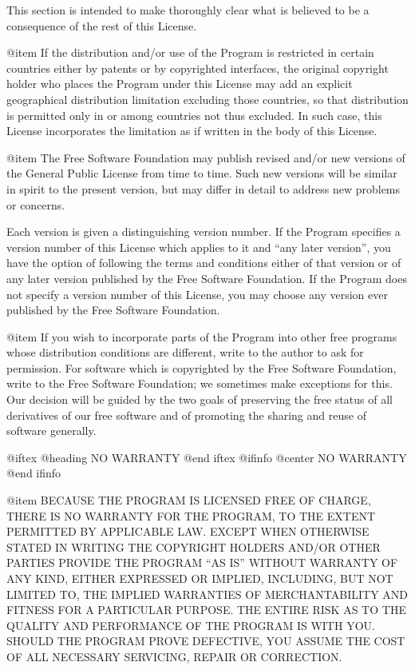 This section is intended to make thoroughly clear what is believed to
be a consequence of the rest of this License.

@item
If the distribution and/or use of the Program is restricted in
certain countries either by patents or by copyrighted interfaces, the
original copyright holder who places the Program under this License
may add an explicit geographical distribution limitation excluding
those countries, so that distribution is permitted only in or among
countries not thus excluded.  In such case, this License incorporates
the limitation as if written in the body of this License.

@item
The Free Software Foundation may publish revised and/or new versions
of the General Public License from time to time.  Such new versions will
be similar in spirit to the present version, but may differ in detail to
address new problems or concerns.

Each version is given a distinguishing version number.  If the Program
specifies a version number of this License which applies to it and ``any
later version'', you have the option of following the terms and conditions
either of that version or of any later version published by the Free
Software Foundation.  If the Program does not specify a version number of
this License, you may choose any version ever published by the Free Software
Foundation.

@item
If you wish to incorporate parts of the Program into other free
programs whose distribution conditions are different, write to the author
to ask for permission.  For software which is copyrighted by the Free
Software Foundation, write to the Free Software Foundation; we sometimes
make exceptions for this.  Our decision will be guided by the two goals
of preserving the free status of all derivatives of our free software and
of promoting the sharing and reuse of software generally.

@iftex
@heading NO WARRANTY
@end iftex
@ifinfo
@center NO WARRANTY
@end ifinfo

@item
BECAUSE THE PROGRAM IS LICENSED FREE OF CHARGE, THERE IS NO WARRANTY
FOR THE PROGRAM, TO THE EXTENT PERMITTED BY APPLICABLE LAW.  EXCEPT WHEN
OTHERWISE STATED IN WRITING THE COPYRIGHT HOLDERS AND/OR OTHER PARTIES
PROVIDE THE PROGRAM ``AS IS'' WITHOUT WARRANTY OF ANY KIND, EITHER EXPRESSED
OR IMPLIED, INCLUDING, BUT NOT LIMITED TO, THE IMPLIED WARRANTIES OF
MERCHANTABILITY AND FITNESS FOR A PARTICULAR PURPOSE.  THE ENTIRE RISK AS
TO THE QUALITY AND PERFORMANCE OF THE PROGRAM IS WITH YOU.  SHOULD THE
PROGRAM PROVE DEFECTIVE, YOU ASSUME THE COST OF ALL NECESSARY SERVICING,
REPAIR OR CORRECTION.

